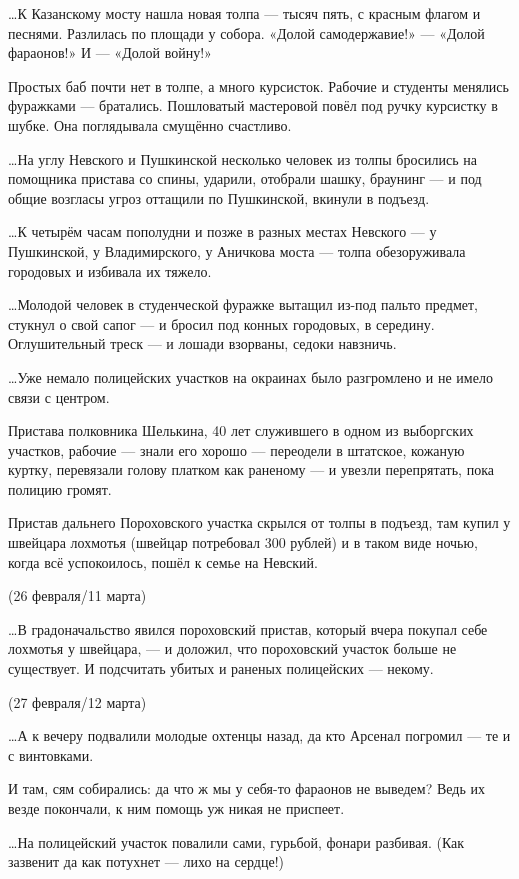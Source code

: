 …К Казанскому мосту нашла новая толпа — тысяч пять, с красным флагом и песнями.
Разлилась по площади у собора. «Долой самодержавие!» — «Долой фараонов!» И —
«Долой войну!»

Простых баб почти нет в толпе, а много курсисток. Рабочие и студенты менялись
фуражками — братались. Пошловатый мастеровой повёл под ручку курсистку в шубке.
Она поглядывала смущённо счастливо.

…На углу Невского и Пушкинской несколько человек из толпы бросились на
помощника пристава со спины, ударили, отобрали шашку, браунинг — и под общие
возгласы угроз оттащили по Пушкинской, вкинули в подъезд.

…К четырём часам пополудни и позже в разных местах Невского — у Пушкинской, у
Владимирского, у Аничкова моста — толпа обезоруживала городовых и избивала их
тяжело.

…Молодой человек в студенческой фуражке вытащил из-под пальто предмет, стукнул
о свой сапог — и бросил под конных городовых, в середину. Оглушительный треск —
и лошади взорваны, седоки навзничь.

…Уже немало полицейских участков на окраинах было разгромлено и не имело связи с центром.

Пристава полковника Шелькина, 40 лет служившего в одном из выборгских участков,
рабочие — знали его хорошо — переодели в штатское, кожаную куртку, перевязали
голову платком как раненому — и увезли перепрятать, пока полицию громят.

Пристав дальнего Пороховского участка скрылся от толпы в подъезд, там купил у
швейцара лохмотья (швейцар потребовал 300 рублей) и в таком виде ночью, когда
всё успокоилось, пошёл к семье на Невский.

(26 февраля/11 марта)

…В градоначальство явился пороховский пристав, который вчера покупал себе
лохмотья у швейцара, — и доложил, что пороховский участок больше не существует.
И подсчитать убитых и раненых полицейских — некому.

(27 февраля/12 марта)

…А к вечеру подвалили молодые охтенцы назад, да кто Арсенал погромил — те и с винтовками.

И там, сям собирались: да что ж мы у себя-то фараонов не выведем? Ведь их везде покончали, к ним помощь уж никая не приспеет.

…На полицейский участок повалили сами, гурьбой, фонари разбивая. (Как зазвенит да как потухнет — лихо на сердце!)

